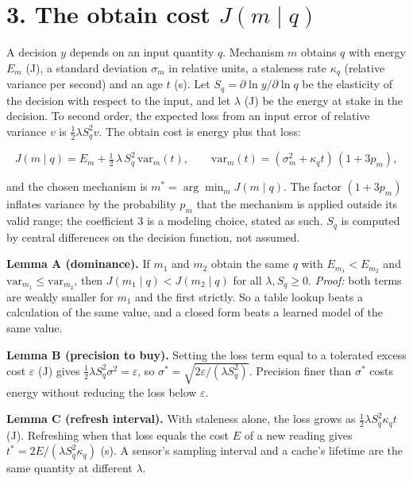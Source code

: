 \documentclass[10pt,letterpaper]{article}
\begin{document}
\section{\texorpdfstring{3. The obtain cost
\(J(m \mid q)\)}{3. The obtain cost J(m \textbackslash mid q)}}\label{the-obtain-cost-jm-mid-q}

A decision \(y\) depends on an input quantity \(q\). Mechanism \(m\)
obtains \(q\) with energy \(E_m\) (J), a standard deviation \(\sigma_m\)
in relative units, a staleness rate \(\kappa_q\) (relative variance per
second) and an age \(t\) (s). Let
\(S_q = \partial \ln y / \partial \ln q\) be the elasticity of the
decision with respect to the input, and let \(\lambda\) (J) be the
energy at stake in the decision. To second order, the expected loss from
an input error of relative variance \(v\) is
\(\tfrac{1}{2}\lambda S_q^2 v\). The obtain cost is energy plus that
loss:

\[J(m \mid q) = E_m + \tfrac{1}{2}\,\lambda\, S_q^2\, \mathrm{var}_m(t), \qquad \mathrm{var}_m(t) = (\sigma_m^2 + \kappa_q t)\,(1 + 3 p_m),\]

and the chosen mechanism is \(m^* = \arg\min_m J(m \mid q)\). The factor
\((1 + 3p_m)\) inflates variance by the probability \(p_m\) that the
mechanism is applied outside its valid range; the coefficient 3 is a
modeling choice, stated as such. \(S_q\) is computed by central
differences on the decision function, not assumed.

\textbf{Lemma A (dominance).} If \(m_1\) and \(m_2\) obtain the same
\(q\) with \(E_{m_1} < E_{m_2}\) and
\(\mathrm{var}_{m_1} \le \mathrm{var}_{m_2}\), then
\(J(m_1 \mid q) < J(m_2 \mid q)\) for all \(\lambda, S_q \ge 0\).
\emph{Proof:} both terms are weakly smaller for \(m_1\) and the first
strictly. So a table lookup beats a calculation of the same value, and a
closed form beats a learned model of the same value.

\textbf{Lemma B (precision to buy).} Setting the loss term equal to a
tolerated excess cost \(\varepsilon\) (J) gives
\(\tfrac{1}{2}\lambda S_q^2 \sigma^2 = \varepsilon\), so
\(\sigma^* = \sqrt{2\varepsilon / (\lambda S_q^2)}\). Precision finer
than \(\sigma^*\) costs energy without reducing the loss below
\(\varepsilon\).

\textbf{Lemma C (refresh interval).} With staleness alone, the loss
grows as \(\tfrac{1}{2}\lambda S_q^2 \kappa_q t\) (J). Refreshing when
that loss equals the cost \(E\) of a new reading gives
\(t^* = 2E / (\lambda S_q^2 \kappa_q)\) (s). A sensor's sampling
interval and a cache's lifetime are the same quantity at different
\(\lambda\).
\end{document}
